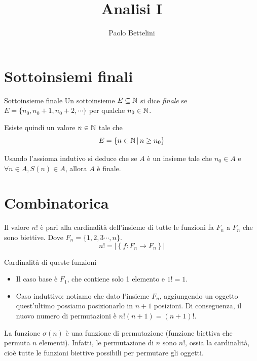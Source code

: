\documentclass[a4paper]{article}
\title{Analisi I}
\author{Paolo Bettelini}
\date{}
\begin{document}
\maketitle
\tableofcontents

\pagebreak

\section{Sottoinsiemi finali}

\begin{snippetdefinition}{Sottoinsieme finale}
    Un sottoinsieme \(E \subseteq \mathbb{N}\) si dice \textit{finale} se
    \(E=\{n_0, n_0+1, n_0+2, \cdots\}\)
    per qualche \(n_0 \in \mathbb{N}\).
\end{snippetdefinition}

Esiste quindi un valore \(n\in \mathbb{N}\) tale che
\[
    E= \{ n \in \mathbb{N} \,|\, n \geq n_0 \}
\]

\begin{snippetproposition}{}
    Usando l'assioma indutivo si deduce che se \(A\) è un insieme tale che \(n_0\in A\)
    e \(\forall n \in A, S(n) \in A\), allora \(A\) è finale.
\end{snippetproposition}

\section{Combinatorica}

Il valore \(n!\) è pari alla cardinalità dell'insieme di tutte le funzioni fa \(F_n\) a \(F_n\)
che sono biettive. Dove \(F_n = \{ 1,2,3 \cdots, n \}\).
\[
    n! = \left| \left\{ f \colon F_n \to F_n \right\} \right|
\]

\begin{snippetproof}{Cardinalità di queste funzioni}
    \begin{itemize}
        \item Il caso base è \(F_1\), che contiene solo 1 elemento e \(1!=1\).
        \item Caso induttivo: notiamo che dato l'insieme \(F_n\), aggiungendo un oggetto
        quest'ultimo possiamo posizionarlo in \(n+1\) posizioni. Di conseguenza, il nuovo numero di
        permutazioni è \(n!(n+1) = (n+1)!\).
    \end{itemize}    
\end{snippetproof}

La funzione \(\sigma(n)\) è una funzione di permutazione (funzione biettiva che permuta \(n\) elementi).
Infatti, le permutazione di \(n\) sono \(n!\), ossia la cardinalità, cioè tutte le funzioni biettive possibili per permutare gli oggetti.
\end{document}
